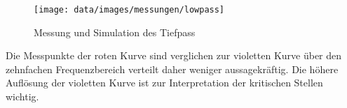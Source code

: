 \begin{figure}[H]
	\begin{center}
		\texttt{[image: data/images/messungen/lowpass]}
		\caption{Messung und Simulation des Tiefpass}
		\label{fig:lowpass-plot}
	\end{center}
\end{figure}

Die Messpunkte der roten Kurve sind verglichen zur violetten Kurve über den zehnfachen Frequenzbereich verteilt daher weniger aussagekräftig. Die höhere Auflösung der violetten Kurve ist zur Interpretation der kritischen Stellen wichtig.
